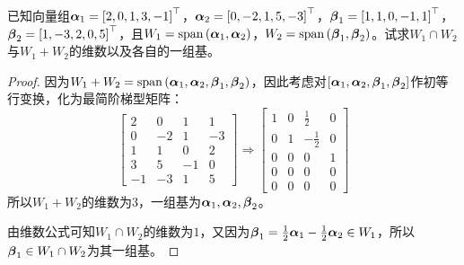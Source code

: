 \setcounter{problem}{15}
\begin{problem}
已知向量组\(\boldsymbol{\alpha}_1=\left[ 2,0,1,3,-1 \right]^\top\)，\(\boldsymbol{\alpha}_2=\left[ 0,-2,1,5,-3 \right]^\top\)，\(\boldsymbol{\beta}_1=\left[ 1,1,0,-1,1 \right]^\top\)，\(\boldsymbol{\beta}_2=\left[ 1,-3,2,0,5 \right]^\top\)，且\(W_1=\mathrm{span}\left( \boldsymbol{\alpha}_1,\boldsymbol{\alpha}_2 \right)\)，\(W_2=\mathrm{span}\left( \boldsymbol{\beta}_1,\boldsymbol{\beta}_2 \right)\)。试求\(W_1\cap W_2\)与\(W_1+W_2\)的维数以及各自的一组基。
\end{problem}
\begin{proof}
    因为\(W_1+W_2=\mathrm{span}\left( \boldsymbol{\alpha}_1,\boldsymbol{\alpha}_2,\boldsymbol{\beta}_1,\boldsymbol{\beta}_2 \right)\)，因此考虑对\(\left[ \boldsymbol{\alpha}_1,\boldsymbol{\alpha}_2,\boldsymbol{\beta}_1,\boldsymbol{\beta}_2 \right]\)作初等行变换，化为最简阶梯型矩阵：
    \begin{equation*}
        \begin{bmatrix}
            2  & 0  & 1  & 1  \\
            0  & -2 & 1  & -3 \\
            1  & 1  & 0  & 2  \\
            3  & 5  & -1 & 0  \\
            -1 & -3 & 1  & 5
        \end{bmatrix}\Rightarrow
        \begin{bmatrix}
            1 & 0 & \frac{1}{2}  & 0 \\
            0 & 1 & -\frac{1}{2} & 0 \\
            0 & 0 & 0            & 1 \\
            0 & 0 & 0            & 0 \\
            0 & 0 & 0            & 0
        \end{bmatrix}
    \end{equation*}
    所以\(W_1+W_2\)的维数为\(3\)，一组基为\(\boldsymbol{\alpha}_1,\boldsymbol{\alpha}_2,\boldsymbol{\beta}_2\)。

    由维数公式可知\(W_1\cap W_2\)的维数为\(1\)，又因为\(\boldsymbol{\beta}_1=\frac{1}{2}\boldsymbol{\alpha}_1-\frac{1}{2}\boldsymbol{\alpha}_2\in W_1\)，所以\(\boldsymbol{\beta}_1\in W_1\cap W_2\)为其一组基。
\end{proof}

